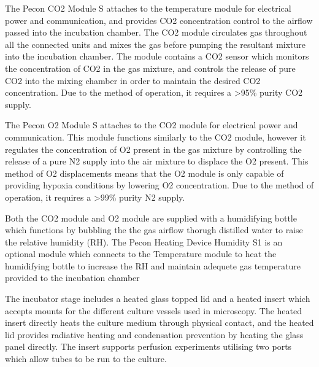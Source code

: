 \documentclass[class=report,11pt,crop=false]{standalone}
\begin{document}
	The Pecon CO2 Module S\cite{peconPeconZeisCO2} attaches to the temperature module for electrical power and communication, and provides CO2 concentration control to the airflow passed into the incubation chamber. The CO2 module circulates gas throughout all the connected units and mixes the gas before pumping the resultant mixture into the incubation chamber. The module contains a CO2 sensor which monitors the concentration of CO2 in the gas mixture, and controls the release of pure CO2 into the mixing chamber in order to maintain the desired CO2 concentration. Due to the method of operation, it requires a >95\% purity CO2 supply.
	
	The Pecon O2 Module S\cite{peconPeconZeisO2} attaches to the CO2 module for electrical power and communication. This module functions similarly to the CO2 module, however it regulates the concentration of O2 present in the gas mixture by controlling the release of a pure N2 supply into the air mixture to displace the O2 present. This method of O2 displacements means that the O2 module is only capable of providing hypoxia conditions by lowering O2 concentration. Due to the method of operation, it requires a >99\% purity N2 supply.
	
	
	Both the CO2 module and O2 module are supplied with a humidifying bottle which functions by bubbling the the gas airflow thorugh distilled water to raise the relative humidity (RH). The Pecon Heating Device Humidity S1\cite{peconPeconZeisHeating} is an optional module which connects to the Temperature module to heat the humidifying bottle to increase the RH and maintain adequete gas temperature provided to the incubation chamber
	
	The incubator stage includes a heated glass topped lid\cite{peconIncubatorS1Compact} and a heated insert which accepts mounts for the different culture vessels used in microscopy. The heated insert directly heats the culture medium through physical contact, and the heated lid provides radiative heating and condensation prevention by heating the glass panel directly. The insert supports perfusion experiments utilising two ports which allow tubes to be run to the culture.
	
	
\end{document}
